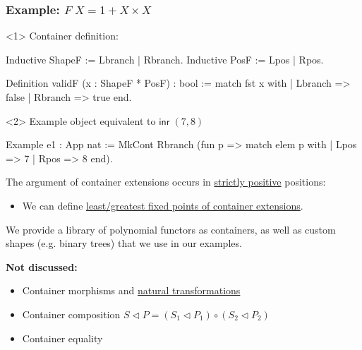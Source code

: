 \begin{frame}[fragile]
  \frametitle{Example: $F\; X = 1 + X \times X$}

\begin{onlyenv}<1>
  Container definition:
  \vspace{.2cm}

\begin{coqcode}
Inductive ShapeF := Lbranch | Rbranch.
Inductive PosF := Lpos | Rpos.

Definition validF (x : ShapeF * PosF) : bool
  := match fst x with | Lbranch => false | Rbranch => true end.
\end{coqcode}
\end{onlyenv}
\begin{onlyenv}<2>
  Example object equivalent to $\mathsf{inr}\;(7,8)$
  \vspace{.2cm}

\begin{coqcode}
Example e1 : App nat :=
  MkCont Rbranch (fun p => match elem p with
                           | Lpos => 7 | Rpos => 8
                           end).
\end{coqcode}
\end{onlyenv}
\end{frame}



\begin{frame}
  The argument of container extensions occurs in \ul{strictly positive} positions:
  \begin{itemize}
    \item[] We can define \ul{least/greatest fixed points of container extensions}.
  \end{itemize}
  \vspace{.5cm}

  We provide a library of polynomial functors as containers, as well as custom
  shapes (e.g. binary trees) that we use in our examples.
  \vspace{.5cm}

  \vspace{.5cm}
  \textbf{Not discussed:}
  \begin{itemize}
    \item Container morphisms and \ul{natural transformations}
    \item Container composition $S \triangleleft P = (S_1 \triangleleft P_1) \circ (S_2 \triangleleft P_2)$
    \item Container equality
  \end{itemize}

\end{frame}

